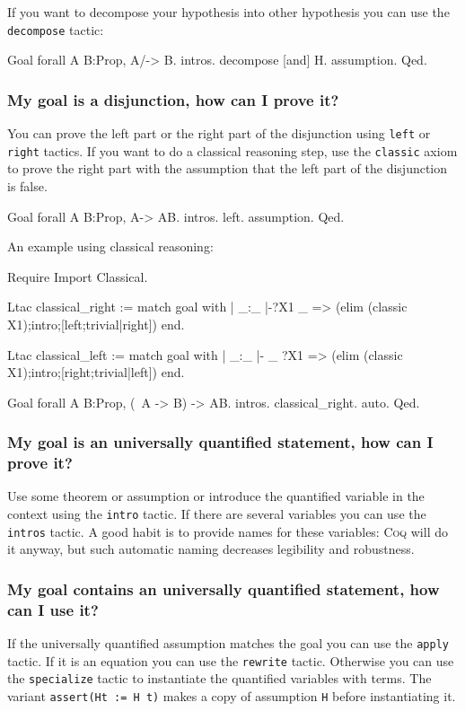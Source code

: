 \documentclass[a4paper,pdftex]{article}
\def\Question#1{\stepcounter{question}\subsubsection{#1}}
\def\Coq{\textsc{Coq}}
\def\left{{\tt left}}
\def\right{{\tt right}}
\def\decompose{{\tt decompose}}
\def\intro{{\tt intro}}
\def\intros{{\tt intros}}
\def\apply{{\tt apply}}
\def\rewrite{{\tt rewrite}}
\def\specialize{{\tt specialize}}
\begin{document}
If you want to decompose your hypothesis into other hypothesis you can use the {\decompose} tactic:

\begin{coq_example}
Goal forall A B:Prop, A/\B-> B.
intros.
decompose [and] H.
assumption.
Qed.
\end{coq_example}


\Question{My goal is a disjunction, how can I prove it?}

You can prove the left part or the right part of the disjunction using
{\left} or {\right} tactics. If you want to do a classical
reasoning step, use the {\tt classic} axiom to prove the right part with the assumption
that the left part of the disjunction is false.

\begin{coq_example}
Goal forall A B:Prop, A-> A\/B.
intros.
left.
assumption.
Qed.
\end{coq_example}

An example using classical reasoning:

\begin{coq_example}
Require Import Classical.

Ltac classical_right := 
match goal with 
| _:_ |-?X1 \/ _ => (elim (classic X1);intro;[left;trivial|right])
end.

Ltac classical_left := 
match goal with 
| _:_ |- _ \/?X1 => (elim (classic X1);intro;[right;trivial|left])
end.


Goal forall A B:Prop, (~A -> B) -> A\/B.
intros.
classical_right.
auto.
Qed.
\end{coq_example}

\Question{My goal is an universally quantified statement, how can I prove it?}

Use some theorem or assumption or introduce the quantified variable in
the context using the {\intro} tactic. If there are several
variables you can use the {\intros} tactic. A good habit is to
provide names for these variables: {\Coq} will do it anyway, but such
automatic naming decreases legibility and robustness.


\Question{My goal contains an universally quantified statement, how can I use it?}

If the universally quantified assumption matches the goal you can
use the {\apply} tactic. If it is an equation you can use the
{\rewrite} tactic. Otherwise you can use the {\specialize} tactic
to instantiate the quantified variables with terms. The variant
{\tt assert(Ht := H t)} makes a copy of assumption {\tt H} before
instantiating it.
\end{document}
